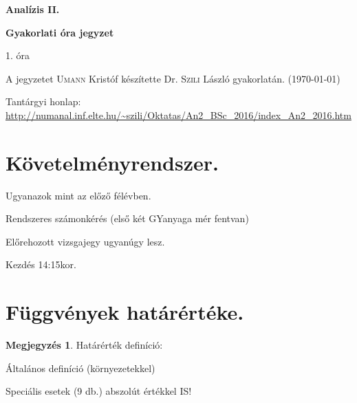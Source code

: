\documentclass[a4paper,11.5pt]{article}
\begin{document}
	\setlength\parindent{0pt}
	\def\s{\hspace{0.2mm}\vphantom{\beta}}
	\def\Z{\mathbb{Z}}
	\def\Q{\mathbb{Q}}
	\def\R{\mathbb{R}}
	\def\C{\mathbb{C}}
	\def\N{\mathbb{N}}
	\def\Rn{\mathbb{R}^{n}}
	\def\Ra{\overline{\mathbb{R}}}
	\def\sume{\displaystyle\sum_{n=1}^{+\infty}}
	\def\sumn{\displaystyle\sum_{n=0}^{+\infty}}
	\def\biz{\emph{Bizonyítás:\ }}
	\def\narrow{\underset{n\rightarrow+\infty}{\longrightarrow}}
	\def\limn{\displaystyle\lim_{n\to +\infty}}
	\def\limx{\displaystyle\lim_{x\to +\infty}}
	
	\theoremstyle{definition}
	\newtheorem{theorem}{Tétel}[subsection] %
	
	\theoremstyle{definition}
	\newtheorem{definition}[theorem]{Definíció} %
	\newtheorem{example}[theorem]{Példa} %
	\newtheorem{task}[theorem]{Feladat} %
	\newtheorem{note}[theorem]{Megjegyzés} %
	\begin{center}
		{\LARGE \textbf{Analízis II.}}
		
		{\large \textbf{Gyakorlati óra jegyzet}}
		
		1. óra
	\end{center}
	A jegyzetet \textsc{Umann} Kristóf készítette Dr. \textsc{Szili} László gyakorlatán. (\today)
	
	Tantárgyi honlap: \url{http://numanal.inf.elte.hu/~szili/Oktatas/An2_BSc_2016/index_An2_2016.htm}
	\section{Követelményrendszer.}
		\begin{compactitem}
			\item Ugyanazok mint az előző félévben.
			\item Rendszeres számonkérés (első két GY\quad anyaga mér fentvan)
			\item Előrehozott vizsgajegy ugyanúgy lesz.
			\item Kezdés 14:15kor.
		\end{compactitem}
	\section{Függvények határértéke.}
		\begin{note}
			Határérték definíció:
			\begin{compactitem}
				\item Általános definíció (környezetekkel)
				\item Speciális esetek (9 db.) abszolút értékkel IS!
			\end{compactitem}
		\end{note}
				
\end{document}
